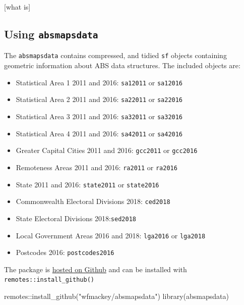\documentclass[
]{book}
\newenvironment{Shaded}{\begin{snugshade}}{\end{snugshade}}
\newcommand{\FunctionTok}[1]{\textcolor[rgb]{0.00,0.00,0.00}{#1}}
\newcommand{\NormalTok}[1]{#1}
\newcommand{\SpecialCharTok}[1]{\textcolor[rgb]{0.00,0.00,0.00}{#1}}
\newcommand{\StringTok}[1]{\textcolor[rgb]{0.31,0.60,0.02}{#1}}
\providecommand{\tightlist}{%
  \setlength{\itemsep}{0pt}\setlength{\parskip}{0pt}}
\begin{document}
{[}what is{]}

\hypertarget{using-absmapsdata}{%
\subsection{\texorpdfstring{Using \texttt{absmapsdata}}{Using absmapsdata}}\label{using-absmapsdata}}

The \texttt{absmapsdata} contains compressed, and tidied \texttt{sf} objects containing geometric information about ABS data structures. The included objects are:

\begin{itemize}
\tightlist
\item
  Statistical Area 1 2011 and 2016: \texttt{sa12011} or \texttt{sa12016}
\item
  Statistical Area 2 2011 and 2016: \texttt{sa22011} or \texttt{sa22016}
\item
  Statistical Area 3 2011 and 2016: \texttt{sa32011} or \texttt{sa32016}
\item
  Statistical Area 4 2011 and 2016: \texttt{sa42011} or \texttt{sa42016}
\item
  Greater Capital Cities 2011 and 2016: \texttt{gcc2011} or \texttt{gcc2016}
\item
  Remoteness Areas 2011 and 2016: \texttt{ra2011} or \texttt{ra2016}
\item
  State 2011 and 2016: \texttt{state2011} or \texttt{state2016}
\item
  Commonwealth Electoral Divisions 2018: \texttt{ced2018}
\item
  State Electoral Divisions 2018:\texttt{sed2018}
\item
  Local Government Areas 2016 and 2018: \texttt{lga2016} or \texttt{lga2018}
\item
  Postcodes 2016: \texttt{postcodes2016}
\end{itemize}

The package is \href{https://github.com/wfmackey/absmapsdata}{hosted on Github} and can be installed with \texttt{remotes::install\_github()}

\begin{Shaded}
\begin{Highlighting}[]
\NormalTok{remotes}\SpecialCharTok{::}\FunctionTok{install\_github}\NormalTok{(}\StringTok{"wfmackey/absmapsdata"}\NormalTok{)}
\FunctionTok{library}\NormalTok{(absmapsdata)}
\end{Highlighting}
\end{Shaded}
\end{document}
